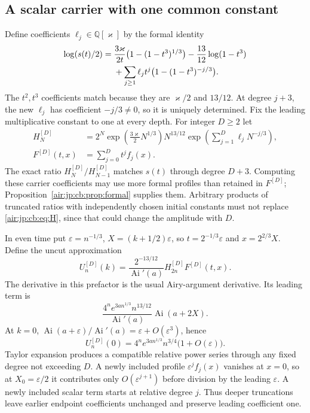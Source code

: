\documentclass[11pt,letterpaper]{article}
\numberwithin{equation}{section}
\theoremstyle{remark}
\newcommand{\Ai}{\operatorname{Ai}}
\newcommand{\Q}{\mathbb{Q}}
\newcommand{\eps}{\varepsilon}
\begin{document}
\subsection{A scalar carrier with one common constant}
Define coefficients $\ell_j\in\Q[\varkappa]$ by the formal identity
\begin{align}
 \log(s(t)/2)={}&\frac{3\varkappa}{2t}\bigl(1-(1-t^3)^{1/3}\bigr)
 -\frac{13}{12}\log(1-t^3)\notag\\
 &+\sum_{j\ge1}\ell_jt^j\bigl(1-(1-t^3)^{-j/3}\bigr).\label{air:jp:cb:eq:carrierrec}
\end{align}
The $t^2,t^3$ coefficients match because they are $\varkappa/2$ and $13/12$. At degree $j+3$, the new $\ell_j$ has coefficient $-j/3\ne0$, so it is uniquely determined. Fix the leading multiplicative constant to one at every depth. For integer $D\ge2$ let
\begin{align}
 H_N^{[D]}&=2^N\exp\!\left(\tfrac{3\varkappa}2N^{1/3}\right)N^{13/12}
  \exp\!\left(\sum_{j=1}^D\ell_jN^{-j/3}\right),\label{air:jp:cb:eq:H}\\
 F^{[D]}(t,x)&=\sum_{j=0}^Dt^jf_j(x).
\end{align}
The exact ratio $H_N^{[D]}/H_{N-1}^{[D]}$ matches $s(t)$ through degree $D+3$. Computing these carrier coefficients may use more formal profiles than retained in $F^{[D]}$; Proposition~\ref{air:jp:cb:prop:formal} supplies them. Arbitrary products of truncated ratios with independently chosen initial constants must not replace \eqref{air:jp:cb:eq:H}, since that could change the amplitude with $D$.

In even time put $\eps=n^{-1/3}$, $X=(k+1/2)\eps$, so $t=2^{-1/3}\eps$ and $x=2^{2/3}X$. Define the uncut approximation
\begin{equation}\label{air:jp:cb:eq:U}
 U_n^{[D]}(k)=\frac{2^{-13/12}}{\Ai'(a)}H_{2n}^{[D]}F^{[D]}(t,x).
\end{equation}
The derivative in this prefactor is the usual Airy-argument derivative. Its leading term is
\[
 \frac{4^ne^{3an^{1/3}}n^{13/12}}{\Ai'(a)}\Ai(a+2X).
\]
At $k=0$, $\Ai(a+\eps)/\Ai'(a)=\eps+O(\eps^3)$, hence
\begin{equation}\label{air:jp:cb:eq:Uendpoint}
 U_n^{[D]}(0)=4^ne^{3an^{1/3}}n^{3/4}\bigl(1+O(\eps)\bigr).
\end{equation}
Taylor expansion produces a compatible relative power series through any fixed degree not exceeding $D$. A newly included profile $\eps^jf_j(x)$ vanishes at $x=0$, so at $X_0=\eps/2$ it contributes only $O(\eps^{j+1})$ before division by the leading $\eps$. A newly included scalar term starts at relative degree $j$. Thus deeper truncations leave earlier endpoint coefficients unchanged and preserve leading coefficient one.
\end{document}
